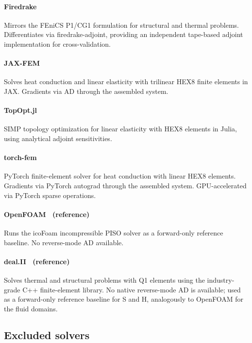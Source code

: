 \documentclass[11pt,a4paper]{article}
\begin{document}
\paragraph{Firedrake~\cite{rathgeber2016firedrake}}
Mirrors the FEniCS P1/CG1 formulation for structural and thermal problems.
Differentiates via firedrake-adjoint, providing an independent
tape-based adjoint implementation for cross-validation.

\paragraph{JAX-FEM~\cite{xue2023jaxfem}}
Solves heat conduction and linear elasticity with trilinear HEX8 finite
elements in JAX. Gradients via AD through the assembled system.

\paragraph{TopOpt.jl~\cite{huang2021topoptjl}}
SIMP topology optimization for linear elasticity with HEX8 elements in
Julia, using analytical adjoint sensitivities.

\paragraph{torch-fem~\cite{meyer2024torchfem}}
PyTorch finite-element solver for heat conduction with linear HEX8 elements.
Gradients via PyTorch autograd through the assembled system.
GPU-accelerated via PyTorch sparse operations.

\paragraph{OpenFOAM~\cite{weller1998tensorial} (reference)}
Runs the icoFoam incompressible PISO solver as a forward-only reference
baseline. No reverse-mode AD available.

\paragraph{deal.II~\cite{bangerth2007dealii,arndt2023dealii} (reference)}
Solves thermal and structural problems with Q1 elements using the
industry-grade C++ finite-element library.
No native reverse-mode AD is available; used as a forward-only reference
baseline for S and H, analogously to OpenFOAM for the fluid domains.

\subsection{Excluded solvers}
\label{app:excluded}
\end{document}

